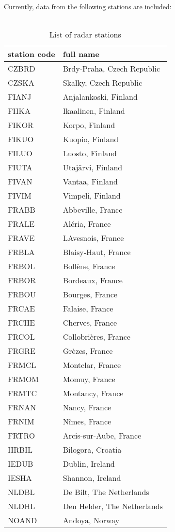Currently, data from the following stations are included:\\
\\
\begin{longtable}[htb]{ll}
\caption{List of radar stations}
\hline
\textbf{station code} & \textbf{full name}\\
\hline
\endhead
CZBRD & Brdy-Praha, Czech Republic\\
CZSKA & Skalky, Czech Republic \\
FIANJ & Anjalankoski, Finland \\
FIIKA & Ikaalinen, Finland \\
FIKOR & Korpo, Finland \\
FIKUO & Kuopio, Finland \\
FILUO & Luosto, Finland \\
FIUTA & Utaj\"{a}rvi, Finland \\
FIVAN & Vantaa, Finland \\
FIVIM & Vimpeli, Finland \\
FRABB & Abbeville, France \\
FRALE & Al\'{e}ria, France \\
FRAVE & LAvesnois, France \\
FRBLA & Blaisy-Haut, France \\
FRBOL & Boll\`{e}ne, France \\
FRBOR & Bordeaux, France \\
FRBOU & Bourges, France \\
FRCAE & Falaise, France \\
FRCHE & Cherves, France \\
FRCOL & Collobri\`{e}res, France \\
FRGRE & Gr\`{e}zes, France \\
FRMCL & Montclar, France \\
FRMOM & Momuy, France \\
FRMTC & Montancy, France \\
FRNAN & Nancy, France \\
FRNIM & N\^{i}mes, France \\
FRTRO & Arcis-sur-Aube, France \\
HRBIL & Bilogora, Croatia \\
IEDUB & Dublin, Ireland  \\
IESHA & Shannon, Ireland  \\
NLDBL & De Bilt, The Netherlands     \\
NLDHL & Den Helder, The Netherlands \\
NOAND & Andoya, Norway \\

\end{longtable}
